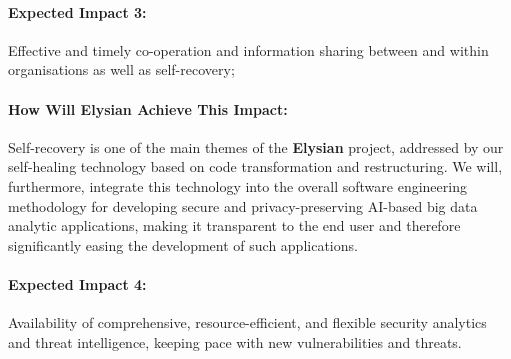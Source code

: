 \documentclass[a4paper,11pt]{article}
\newcommand{\project}[1]{\textbf{#1}\xspace}
\newcommand{\SECURITY}{\project{Elysian}}
\newcommand{\TheProject}{\SECURITY}
\begin{document}
\begin{mdframed}[backgroundcolor=blue!5]
\paragraph{Expected Impact 3:}
Effective and timely co-operation and information sharing between and within organisations as well as self-recovery;
\end{mdframed}

\begin{mdframed}[backgroundcolor=gray!10]
\paragraph{How Will \TheProject{} Achieve This Impact:}
Self-recovery is one of the main themes of the \TheProject{} project, addressed by our self-healing technology based on code transformation and restructuring. We will, furthermore, integrate this technology into the overall software engineering methodology for developing secure and privacy-preserving AI-based big data analytic applications, making it transparent to the end user and therefore significantly easing the development of such applications. 
\end{mdframed}

\begin{mdframed}[backgroundcolor=blue!5]
\paragraph{Expected Impact 4:}
Availability of comprehensive, resource-efficient, and flexible security analytics and threat intelligence, keeping pace with new vulnerabilities and threats.
\end{mdframed}
\end{document}
